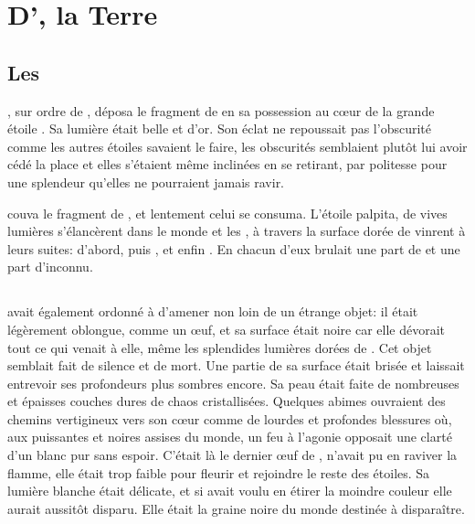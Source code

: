 \chapter{D'\Orba, la Terre}

\section{Les \Ea}

\Carac, sur ordre de \Cind, déposa le fragment de \Drisst en sa possession au cœur de la grande étoile \Naos. Sa lumière était belle et d'or. Son éclat ne repoussait pas l'obscurité comme les autres étoiles savaient le faire, les obscurités semblaient plutôt lui avoir cédé la place et elles s'étaient même inclinées en se retirant, par politesse pour une splendeur qu'elles ne pourraient jamais ravir. 

\Naos couva le fragment de \Drisst, et lentement celui se consuma. L'étoile palpita, de vives lumières s'élancèrent dans le monde et les \Ea, à travers la surface dorée de \Naos vinrent à leurs suites: \Oros d'abord, puis \Fercor, et enfin \Nio. En chacun d'eux brulait une part de \Mey et une part d'inconnu.

\section{\Orba}

\Cind avait également ordonné à \Carac d'amener non loin de \Naos un étrange objet: il était légèrement oblongue, comme un œuf, et sa surface était noire car elle dévorait tout ce qui venait à elle, même les splendides lumières dorées de \Naos. Cet objet semblait fait de silence et de mort. Une partie de sa surface était brisée et laissait entrevoir ses profondeurs plus sombres encore. Sa peau était faite de nombreuses et épaisses couches dures de chaos cristallisées. %
Quelques abimes ouvraient des chemins vertigineux vers son cœur comme de lourdes et profondes blessures où, aux puissantes et noires assises du monde, un feu à l'agonie opposait une clarté d'un blanc pur sans espoir. C'était là le dernier œuf de \Tot, \Carac n'avait pu en raviver la flamme, elle était trop faible pour fleurir et rejoindre le reste des étoiles. Sa lumière blanche était délicate, et si \Carac avait voulu en étirer la moindre couleur elle aurait aussitôt disparu. Elle était la graine noire du monde destinée à disparaître.

